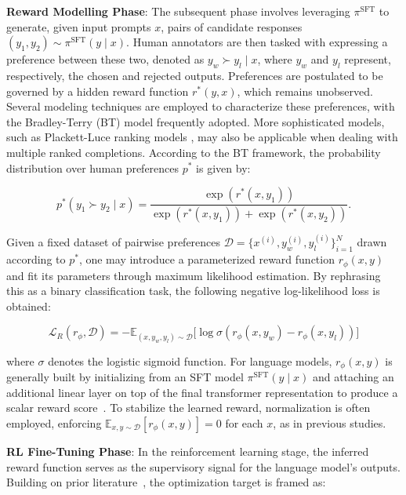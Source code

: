 \textbf{Reward Modelling Phase}: The subsequent phase involves leveraging $\pi^\text{SFT}$ to generate, given input prompts $x$, pairs of candidate responses $(y_1, y_2)\sim \pi^\text{SFT}(y \mid x)$. Human annotators are then tasked with expressing a preference between these two, denoted as $y_w\succ y_l \mid x$, where $y_w$ and $y_l$ represent, respectively, the chosen and rejected outputs. Preferences are postulated to be governed by a hidden reward function $r^*(y, x)$, which remains unobserved. Several modeling techniques are employed to characterize these preferences, with the Bradley-Terry (BT) \cite{bradley1952rankanalysis} model frequently adopted. More sophisticated models, such as Plackett-Luce ranking models \citep{plackett1975analysis, luce2012individual}, may also be applicable when dealing with multiple ranked completions. According to the BT framework, the probability distribution over human preferences $p^*$ is given by:

\begin{equation}\label{eq:bradley-terry}
    p^*(y_1\succ y_2 \mid x)=\frac{\exp\left(r^*(x, y_1)\right)}{\exp\left(r^*(x, y_1)\right) + \exp\left(r^*(x, y_2)\right)}.
\end{equation}

Given a fixed dataset of pairwise preferences $\mathcal{D}=\bigl\{x^{(i)}, y_w^{(i)}, y_l^{(i)}\bigr\}_{i=1}^N$ drawn according to $p^*$, one may introduce a parameterized reward function $r_{\phi}(x, y)$ and fit its parameters through maximum likelihood estimation. By rephrasing this as a binary classification task, the following negative log-likelihood loss is obtained:

\begin{equation}\label{eq:reward_model}
    \mathcal{L}_R(r_{\phi}, \mathcal{D}) = -\mathbb{E}_{(x, y_w, y_l)\sim \mathcal{D}}\bigl[\log \sigma(r_{\phi}(x, y_w)- r_{\phi}(x, y_l))\bigr]
\end{equation}

where $\sigma$ denotes the logistic sigmoid function. For language models, $r_{\phi}(x, y)$ is generally built by initializing from an SFT model $\pi^\text{SFT}(y \mid x)$ and attaching an additional linear layer on top of the final transformer representation to produce a scalar reward score~\cite{ziegler2020finetuning}. To stabilize the learned reward, normalization is often employed, enforcing  $\mathbb{E}_{x,y\sim \mathcal{D}}\left[r_\phi(x, y)\right] = 0$ for each $x$, as in previous studies.

\textbf{RL Fine-Tuning Phase}: In the reinforcement learning stage, the inferred reward function serves as the supervisory signal for the language model's outputs. Building on prior literature~\citep{jaques2017sequence, jaques2020human}, the optimization target is framed as:

